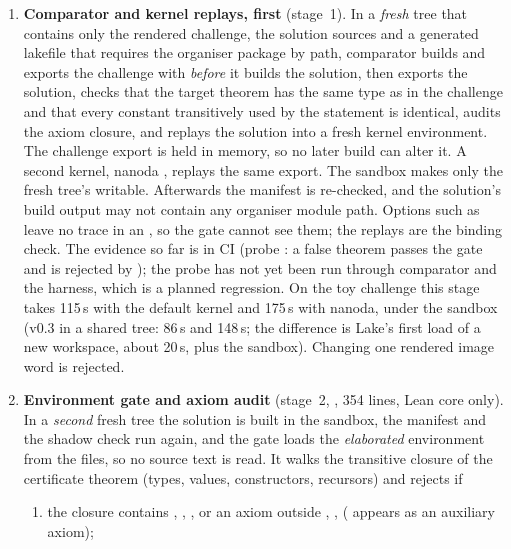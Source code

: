 \begin{enumerate}[leftmargin=1.5em,itemsep=2pt]
  so the manifest is a pin: CI fails when the organiser build drifts.
\item \textbf{Comparator and kernel replays, first} (stage~1). In a \emph{fresh} tree that contains
  only the rendered challenge, the solution sources and a generated lakefile that requires the
  organiser package by path, comparator \cite{comparator} builds and exports the challenge with
   \cite{lean4export} \emph{before} it builds the solution, then exports the
  solution, checks that the target theorem has the same type as in the challenge and that every
  constant transitively used by the statement is identical, audits the axiom closure, and replays
  the solution into a fresh kernel environment. The challenge export is held in memory, so no later
  build can alter it. A second kernel, nanoda \cite{nanoda}, replays the same export. The sandbox
  makes only the fresh tree's  writable. Afterwards the manifest is re-checked, and the
  solution's build output may not contain any organiser module path. Options such as
   leave no trace in an , so the gate cannot see them; the
  replays are the binding check. The evidence so far is  in CI (probe
  : a false theorem passes the gate and is rejected by ); the probe
  has not yet been run through comparator and the harness, which is a planned regression. On the toy challenge this stage takes 115\,s with the default
  kernel and 175\,s with nanoda, under the sandbox (v0.3 in a shared tree: 86\,s and 148\,s; the
  difference is Lake's first load of a new workspace, about 20\,s, plus the sandbox). Changing one
  rendered image word is rejected.
\item \textbf{Environment gate and axiom audit} (stage~2, , 354 lines, Lean
  core only). In a \emph{second} fresh tree the solution is built in the sandbox, the manifest and the
  shadow check run again, and the gate loads the \emph{elaborated} environment from the 
  files, so no source text is read. It walks the transitive closure of the certificate theorem
  (types, values, constructors, recursors) and rejects if
  \begin{enumerate}[label=(\roman*),nosep]
  \item the closure contains , , ,
     or an axiom outside , ,
     ( appears as an auxiliary axiom);

\end{enumerate}
\end{enumerate}
